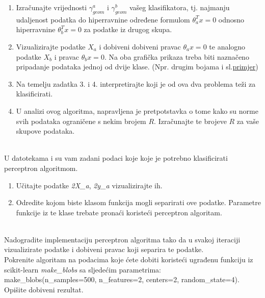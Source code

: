 \documentclass{../../OM_style}
\begin{document}
\begin{zadatak}
\begin{enumerate}[label=\alph*)]
\item Izračunajte vrijednosti $\gamma_{geom}^a$ i  $\gamma_{geom}^b$ vašeg klasifikatora, tj. najmanju udaljenost podatka do hiperravnine određene formulom $\theta_a ^{T} x = 0$ odnosno hiperravnine $\theta_b ^{T} x = 0$ za podatke iz drugog skupa. 
\item Vizualizirajte podatke $X_a$ i dobiveni dobiveni pravac $\theta_a x = 0$ te analogno podatke $X_b$ i pravac $\theta_b x = 0$. Na oba grafička prikaza treba biti naznačeno pripadanje podataka jednoj od dvije klase. (Npr. drugim bojama i sl.\href{https://www.researchgate.net/profile/Francois_Kawala/publication/285653348/figure/fig5/AS:669589956460558@1536654094794/This-illustration-present-a-binary-classification-that-is-performed-on-two-features.png}{primjer})
\item Na temelju zadatka 3. i 4. interpretirajte koji je od ova dva problema teži za klasificirati. 
\item U analizi ovog algoritma, napravljena je pretpotstavka o tome kako su norme svih podataka ograničene s nekim brojem $R$. Izračunajte te brojeve $R$ za vaše skupove podataka. 

\end{enumerate}
\end{zadatak}
\newpage


\begin{zadatak}\hfill \\
U datotekama i su vam zadani podaci koje koje je potrebno klasificirati perceptron algoritmom. 
\begin{enumerate}[label=\alph*)]

        \item Učitajte podatke \textit{2X\_a}, \textit{2y\_a} vizualizirajte ih. 
        \item Odredite kojom biste klasom funkcija mogli separirati ove podatke. Parametre funkcije iz te klase trebate pronaći koristeći perceptron algoritam. 
    

\end{enumerate}
\end{zadatak}


\begin{zadatak}\hfill \\
Nadogradite implementaciju perceptron algoritma tako da u svakoj iteraciji vizualizirate podatke i dobiveni pravac koji separira te podatke. \\
Pokrenite algoritam na podacima koje ćete dobiti koristeći ugrađenu funkciju iz scikit-learn \textit{make\_blobs} sa sljedećim parametrima: \\ make\_blobs(n\_samples=500, n\_features=2, centers=2, random\_state=4).\\

\noindent Opišite dobiveni rezultat. 

\end{zadatak}
\end{document}
